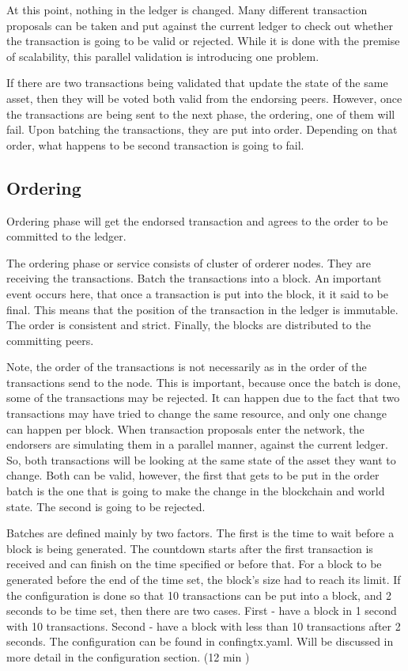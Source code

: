 \documentclass[a4paper,11pt]{report}
\begin{document}
	At this point, nothing in the ledger is changed. Many different transaction proposals can be taken and put against the current ledger to check out whether the transaction is going to be valid or rejected. While it is done with the premise of scalability, this parallel validation is introducing one problem. 
	
	If there are two transactions being validated that update the state of the same asset, then they will be voted both valid from the endorsing peers. However, once the transactions are being sent to the next phase, the ordering, one of them will fail. Upon batching the transactions, they are put into order. Depending on that order, what happens to be second transaction is going to fail.

\subsection{Ordering}
Ordering phase will get the endorsed transaction and agrees to the order to be committed to the ledger.

The ordering phase or service consists of cluster of orderer nodes. They are receiving the transactions. Batch the transactions into a block. An important event occurs here, that once a transaction is put into the block, it it said to be final. This means that the position of the transaction in the ledger is immutable. The order is consistent and strict. Finally, the blocks are distributed to the committing peers.
	
Note, the order of the transactions is not necessarily as in the order of the transactions send to the node. This is important, because once the batch is done, some of the transactions may be rejected. It can happen due to the fact that two transactions may have tried to change the same resource, and only one change can happen per block. When transaction proposals enter the network, the endorsers are simulating them in a parallel manner, against the current ledger. So, both transactions will be looking at the same state of the asset they want to change. Both can be valid, however, the first that gets to be put in the order batch is the one that is going to make the change in the blockchain and world state. The second is going to be rejected.
	
Batches are defined mainly by two factors. The first is the time to wait before a block is being generated. The countdown starts after the first transaction is received and can finish on the time specified or before that. For a block to be generated before the end of the time set, the block’s size had to reach its limit. If the configuration is done so that 10 transactions can be put into a block, and 2 seconds to be time set, then there are two cases. First - have a block in 1 second with 10 transactions. Second - have a block with less than 10 transactions after 2 seconds. The configuration can be found in confingtx.yaml. Will be discussed in more detail in the configuration section. (12 min \cite{gattaka} )
\end{document}
